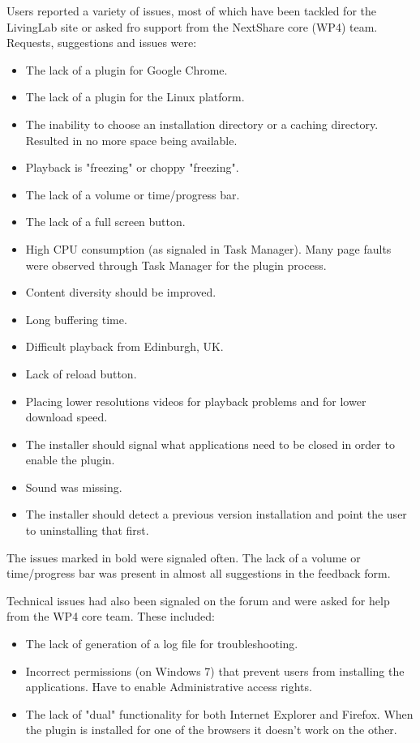 Users reported a variety of issues, most of which have been tackled for the
LivingLab site or asked fro support from the NextShare core (WP4) team.
Requests, suggestions and issues were:
\begin{itemize}
  \item The lack of a plugin for Google Chrome.
  \item The lack of a plugin for the Linux platform.
  \item The inability to choose an installation directory or a caching
  directory. Resulted in no more space being available.
  \item Playback is "freezing" or choppy "freezing".
  \item The lack of a volume or time/progress bar.
  \item The lack of a full screen button.
  \item High CPU consumption (as signaled in Task Manager). Many page faults
  were observed through Task Manager for the plugin process.
  \item Content diversity should be improved.
  \item Long buffering time.
  \item Difficult playback from Edinburgh, UK.
  \item Lack of reload button.
  \item Placing lower resolutions videos for playback problems and for lower
  download speed.
  \item The installer should signal what applications need to be closed in
  order to enable the plugin.
  \item Sound was missing.
  \item The installer should detect a previous version installation and point
  the user to uninstalling that first.
\end{itemize}

The issues marked in bold were signaled often. The lack of a volume or
time/progress bar was present in almost all suggestions in the feedback form.

Technical issues had also been signaled on the forum and were asked for help
from the WP4 core team. These included:
\begin{itemize}
  \item The lack of generation of a log file for troubleshooting.
  \item Incorrect permissions (on Windows 7) that prevent users from
  installing the applications. Have to enable Administrative access rights.
  \item The lack of "dual" functionality for both Internet Explorer and
  Firefox. When the plugin is installed for one of the browsers it doesn't
  work on the other.
\end{itemize}


